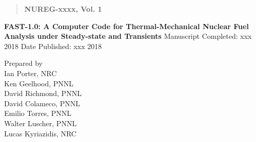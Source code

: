 \begin{quote}
 \textbf{NUREG-xxxx, Vol. 1}
\end{quote}

\textbf{FAST-1.0: A Computer Code for Thermal-Mechanical Nuclear Fuel Analysis under Steady-state and Transients}
\newline{}
Manuscript Completed: xxx 2018
\newline{}
Date Published: xxx 2018

Prepared by
\\
Ian Porter, NRC      \\
Ken Geelhood, PNNL   \\
David Richmond, PNNL \\
David Colameco, PNNL \\
Emilio Torres, PNNL  \\
Walter Luscher, PNNL \\
Lucas Kyriazidis, NRC \\

\newpage